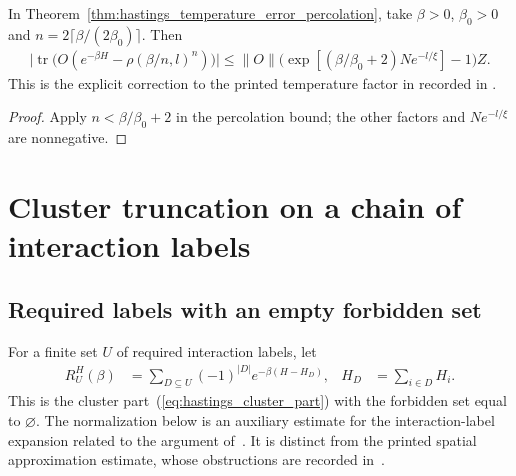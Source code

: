 \begin{corollary}
    \label{cor:hastings_temperature_error_add_two}
    \leanok
    In Theorem~\ref{thm:hastings_temperature_error_percolation}, take
    $\beta>0$, $\beta_0>0$ and
    $n=2\lceil\beta/(2\beta_0)\rceil$. Then
    \begin{align*}
        \bigl|\operatorname{tr}\bigl(O(e^{-\beta H}-\rho(\beta/n,l)^n)\bigr)\bigr|
        \le\|O\|\bigl(\exp[(\beta/\beta_0+2)Ne^{-l/\xi}]-1\bigr)Z.
    \end{align*}
    This is the explicit correction to the printed temperature factor
    in \cite[lines 1342--1347]{Hastings2006Solving}
    recorded in \cite{gap:hastings05_temperature_factor_count}.
\end{corollary}
\begin{proof}\leanok
    Apply $n<\beta/\beta_0+2$ in the percolation bound; the other
    factors and $Ne^{-l/\xi}$ are nonnegative.
\end{proof}

\section{Cluster truncation on a chain of interaction labels}
\label{sec:interval_cluster_truncation}

\subsection{Required labels with an empty forbidden set}

For a finite set $U$ of required interaction labels, let
\begin{align}
    R_U^H(\beta)
     & =\sum_{D\subseteq U}(-1)^{|D|}
    e^{-\beta(H-H_D)},
     & H_D                            & =\sum_{i\in D}H_i.
    \label{eq:mandatory_cluster_part}
\end{align}
This is the cluster part~(\ref{eq:hastings_cluster_part}) with the forbidden
set equal to $\varnothing$. The normalization below is an auxiliary
estimate for the interaction-label expansion related to the argument
of~\cite[lines 1270--1291 and 1935--1968]{Arad2016RigorousRG}.
It is distinct from the printed spatial approximation estimate, whose
obstructions are recorded in~\cite{gap:alvv16_cluster_approximation}.

